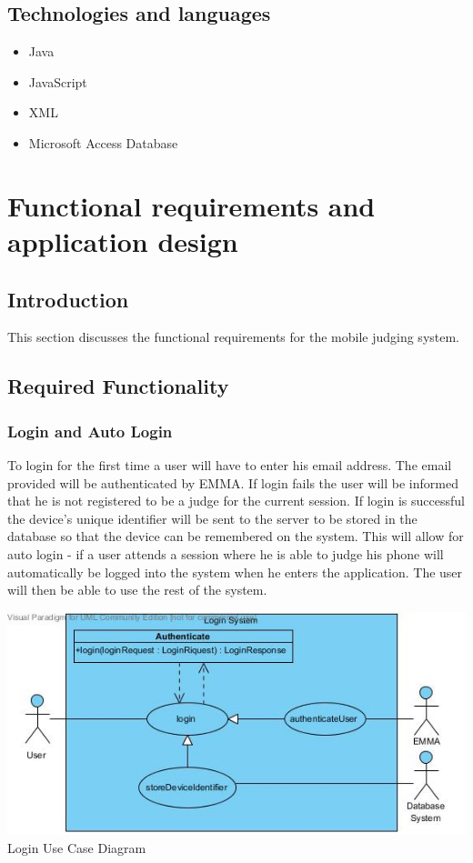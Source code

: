 \documentclass[10pt,a4paper]{article}
\begin{document}
\subsection{Technologies and languages}
\begin{itemize}
\item Java
\item JavaScript
\item XML
\item Microsoft Access Database
\end{itemize}

\pagebreak
\section{Functional requirements and application design}
\subsection{Introduction}
This section discusses the functional requirements for the mobile judging system.
\subsection{Required Functionality}
\subsubsection{Login and Auto Login}
To login for the first time a user will have to enter his email address. The email provided will be authenticated by EMMA. If login fails the user will be informed that he is not registered to be a judge for the current session. If login is successful the device's unique identifier will be sent to the server to be stored in the database so that the device can be remembered on the system. This will allow for auto login - if a user attends a session where he is able to judge his phone will automatically be logged into the system when he enters the application. The user will then be able to use the rest of the system.

\begin{center}
\advance\leftskip-1.3cm
\includegraphics[width=160mm]{Pictures/Login.jpg} 
Login Use Case Diagram 
\end{center}
\end{document}
